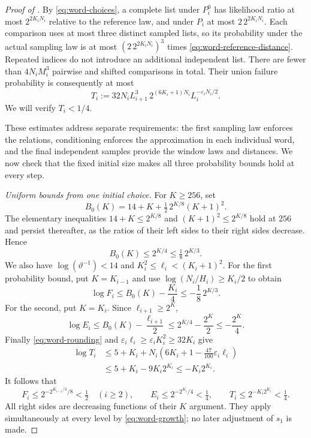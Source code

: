 \begin{proof}[Proof of ]
By \eqref{eq:word-choices}, a complete list under $P_i^0$ has likelihood
ratio at most $2^{2K_iN_i}$ relative to the reference law, and under
$P_i$ at most $2\,2^{2K_iN_i}$.
Each comparison uses at most three distinct sampled lists, so its
probability under the actual sampling law is at most
$(2\,2^{2K_iN_i})^3$ times \eqref{eq:word-reference-distance}.
Repeated indices do not introduce an additional independent list.
There are fewer than $4N_iM_i^3$ pairwise and shifted comparisons in
total.  Their union failure probability is consequently at most
\begin{equation}\label{eq:word-distance-budget}
  T_i:=32N_iL_{i+1}^3\,
       2^{(6K_i+1)N_i}L_i^{-\varepsilon_iN_i/2}.
\end{equation}
We will verify $T_i<1/4$.

These estimates address separate requirements: the first sampling law
enforces the relations, conditioning enforces the approximation in
each individual word, and the final independent samples provide the
window laws and distances.  We now check that the fixed initial size
makes all three probability bounds hold at every step.

\smallskip\noindent
\emph{Uniform bounds from one initial choice.}
For $K\ge256$, set
\[
  B_0(K)=14+K+\tfrac12\,2^{K/8}(K+1)^2.
\]
The elementary inequalities
$14+K\le2^{K/8}$ and $(K+1)^2\le2^{K/8}$ hold at $256$ and persist
thereafter, as the ratios of their left sides to their right sides
decrease.  Hence
\begin{equation}\label{eq:word-common-bound}
 B_0(K)\le2^{K/4}\le\tfrac18\,2^{K/3}.
\end{equation}
We also have $\log(\vartheta^{-1})<14$ and
$K_i^2\le\ell_i<(K_i+1)^2$.
For the first probability bound, put $K=K_{i-1}$ and use
$\log(N_i/H_i)\ge K_i/2$ to obtain
\[
 \log F_i
   \le B_0(K)-\frac{K_i}{4}
   \le-\frac18\,2^{K/3}.
\]
For the second, put $K=K_i$.  Since $\ell_{i+1}\ge2^K$,
\[
 \log E_i
   \le B_0(K)-\frac{\ell_{i+1}}2
   \le2^{K/4}-\frac{2^K}{2}
   \le-\frac{2^K}{4}.
\]
Finally \eqref{eq:word-rounding} and
$\varepsilon_i\ell_i\ge\varepsilon_iK_i^2\ge32K_i$ give
\begin{align*}
 \log T_i
 &\le5+K_i+N_i
       \left(6K_i+1-\frac{47}{100}\varepsilon_i\ell_i\right)\\
 &\le5+K_i-9K_i2^{K_i}
  \le-K_i2^{K_i}.
\end{align*}
It follows that
\begin{equation}\label{eq:word-uniform-budgets}
 F_i\le2^{-2^{K_{i-1}/3}/8}<\tfrac12\quad(i\ge2),\qquad
 E_i\le2^{-2^{K_i}/4}<\tfrac14,\qquad
 T_i\le2^{-K_i2^{K_i}}<\tfrac14.
\end{equation}
All right sides are decreasing functions of their $K$ argument.
They apply simultaneously at every level by \eqref{eq:word-growth};
no later adjustment of $s_1$ is made.


\end{proof}
